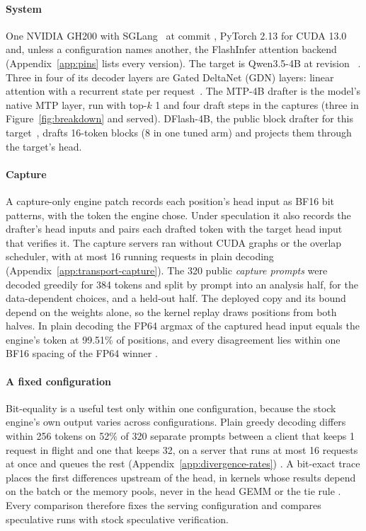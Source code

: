 \paragraph{System} One NVIDIA GH200 with SGLang~\cite{sglangpaper} at commit \sourcepin{}, PyTorch 2.13 for CUDA 13.0 and, unless a configuration names another, the FlashInfer attention backend (Appendix~\ref{app:pins} lists every version). The target is Qwen3.5-4B at revision \modelpin~\cite{qwencard}. Three in four of its decoder layers are Gated DeltaNet (GDN) layers: linear attention with a recurrent state per request~\cite{gdn}. The MTP-4B drafter is the model's native MTP layer, run with top-$k$ 1 and four draft steps in the captures (three in Figure~\ref{fig:breakdown} and served). DFlash-4B, the public block drafter for this target~\cite{dflashpaper,dflash4bcard}, drafts 16-token blocks (8 in one tuned arm) and projects them through the target's head.

\paragraph{Capture} A capture-only engine patch records each position's head input as BF16 bit patterns, with the token the engine chose. Under speculation it also records the drafter's head inputs and pairs each drafted token with the target head input that verifies it. The capture servers ran without CUDA graphs or the overlap scheduler, with at most 16 running requests in plain decoding (Appendix~\ref{app:transport-capture}). The 320 public \emph{capture prompts} were decoded greedily for 384 tokens and split by prompt into an analysis half, for the data-dependent choices, and a held-out half. The deployed copy and its bound depend on the weights alone, so the kernel replay draws positions from both halves. In plain decoding the FP64 argmax of the captured head input equals the engine's token at 99.51\% of positions, and every disagreement lies within one BF16 spacing of the FP64 winner .
\paragraph{A fixed configuration}\label{sec:same-shape} Bit-equality is a useful test only within one configuration, because the stock engine's own output varies across configurations. Plain greedy decoding differs within 256 tokens on 52\% of 320 separate prompts between a client that keeps 1 request in flight and one that keeps 32, on a server that runs at most 16 requests at once and queues the rest (Appendix~\ref{app:divergence-rates}) . A bit-exact trace places the first differences upstream of the head, in kernels whose results depend on the batch or the memory pools, never in the head GEMM or the tie rule . Every comparison therefore fixes the serving configuration and compares speculative runs with stock speculative verification.

